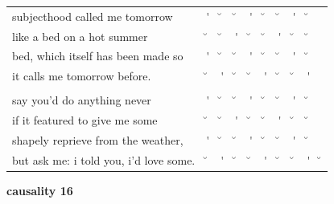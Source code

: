 \documentclass[12pt, landscape]{article}
\begin{document}
\begin{center}
\begin{tabularx}{\textwidth}{
>{\lefting\arraybackslash}X
c
c
c
c
c
c
c
c
c
}

subjecthood called me tomorrow & \'{} & \u{} & \u{} & \'{} & \u{} & \u{} & \'{} & \u{} & \\
like a bed on a hot summer & \u{} & \u{} & \'{} & \u{} & \u{} & \'{} & \u{} & \u{} & \\
bed, which itself has been made so & \'{} & \u{} & \u{} & \'{} & \u{} & \u{} & \'{} & \u{} & \\
it calls me tomorrow before. & \u{} & \'{} & \u{} & \u{} & \'{} & \u{} & \u{} & \'{} & \\
 & & & & & & & & \\
say you'd do anything never & \'{} & \u{} & \u{} & \'{} & \u{} & \u{} & \'{} & \u{} & \\
if it featured to give me some & \u{} & \u{} & \'{} & \u{} & \u{} & \'{} & \u{} & \u{} & \\
shapely reprieve from the weather, & \'{} & \u{} & \u{} & \'{} & \u{} & \u{} & \'{} & \u{} & \\
but ask me: i told you, i'd love some. & \u{} & \'{} & \u{} & \u{} & \'{} & \u{} & \u{} & \'{} & \u{} \\

\end{tabularx}
\end{center}

\vspace*{\fill}

\newpage

\vspace*{\fill}

\noindent \textbf{causality 16}
\noindent \hfill \par
\end{document}
